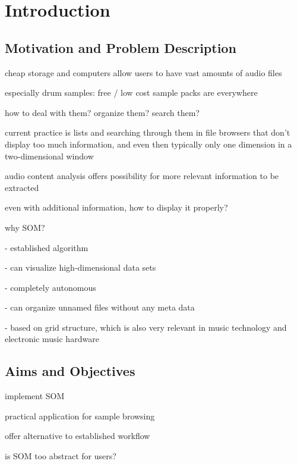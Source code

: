 
\section{Introduction}
\label{sec:introduction}

\subsection{Motivation and Problem Description}
\label{subsec:motivation}

cheap storage and computers allow users to have vast amounts of audio files

especially drum samples: free / low cost sample packs are everywhere

how to deal with them? organize them? search them?



current practice is lists and searching through them in file browsers that
don't display too much information, and even then typically only one dimension
in a two-dimensional window

audio content analysis offers possibility for more relevant information to be
extracted

even with additional information, how to display it properly?


why SOM?

- established algorithm

- can visualize high-dimensional data sets

- completely autonomous

- can organize unnamed files without any meta data

- based on grid structure, which is also very relevant in music technology and
electronic music hardware
\citet{adeney2009}



\subsection{Aims and Objectives}
\label{subsec:aims}

implement SOM

practical application for sample browsing

offer alternative to established workflow



is SOM too abstract for users?



